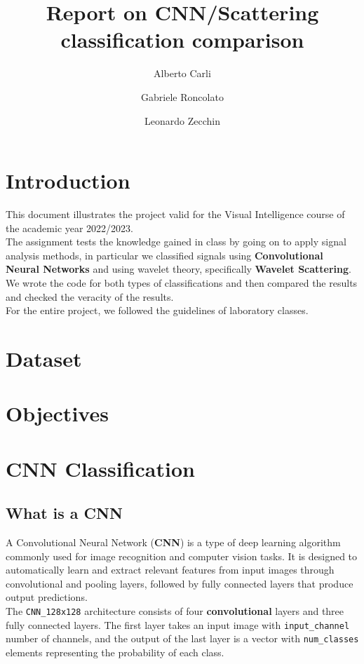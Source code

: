 \documentclass{report}
\title{Report on CNN/Scattering classification comparison}
\author{Alberto Carli \and Gabriele Roncolato \and Leonardo Zecchin }
\date{}
\begin{document}
\maketitle
\tableofcontents
\pagebreak

\chapter{Introduction}
This document illustrates the project valid for the Visual Intelligence course of the academic year 2022/2023. \\
The assignment tests the knowledge gained in class by going on to apply signal analysis methods, in particular we classified signals using \textbf{Convolutional Neural Networks} and using wavelet theory, specifically  \textbf{Wavelet Scattering}. \\
We wrote the code for both types of classifications and then compared the results and checked the veracity of the results. \\
For the entire project, we followed the guidelines of laboratory classes.


\chapter{Dataset}
\chapter{Objectives}
\chapter{CNN Classification}
\section{What is a CNN}
A Convolutional Neural Network (\textbf{CNN}) is a type of deep learning algorithm commonly used for image recognition and computer vision tasks. It is designed to automatically learn and extract relevant features from input images through convolutional and pooling layers, followed by fully connected layers that produce output predictions. \\
The \texttt{CNN\_128x128} architecture consists of four \textbf{convolutional} layers and three fully connected layers. The first layer takes an input image with \texttt{input\_channel} number of channels, and the output of the last layer is a vector with \texttt{num\_classes} elements representing the probability of each class.
\end{document}
